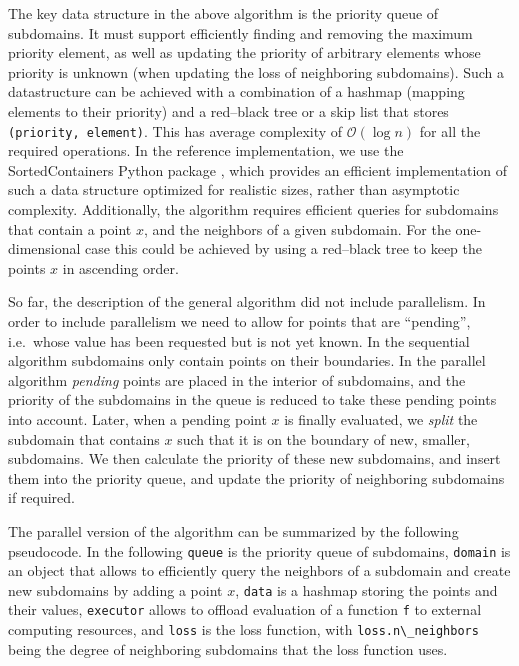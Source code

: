 
The key data structure in the above algorithm is the priority queue of subdomains.
It must support efficiently finding and removing the maximum priority element, as well as updating the priority of arbitrary elements whose priority is unknown (when updating the loss of neighboring subdomains).
Such a datastructure can be achieved with a combination of a hashmap (mapping elements to their priority) and a red--black tree or a skip list \cite{Cormen2009} that stores \passthrough{\lstinline!(priority, element)!}.
This has average complexity of $\mathcal{O}(\log{n})$ for all the required operations.
In the reference implementation, we use the SortedContainers Python package \cite{Jenks2014}, which provides an efficient implementation of such a data structure optimized for realistic sizes, rather than asymptotic complexity.
Additionally, the algorithm requires efficient queries for subdomains that contain a point $x$, and the neighbors of a given subdomain.
For the one-dimensional case this could be achieved by using a red--black tree to keep the points $x$ in ascending order.


So far, the description of the general algorithm did not include parallelism.
In order to include parallelism we need to allow for points that are ``pending'', i.e.~whose value has been requested but is not yet known.
In the sequential algorithm subdomains only contain points on their boundaries.
In the parallel algorithm \emph{pending} points are placed in the interior of subdomains, and the priority of the subdomains in the queue is reduced to take these pending points into account.
Later, when a pending point $x$ is finally evaluated, we \emph{split} the subdomain that contains $x$ such that it is on the boundary of new, smaller, subdomains.
We then calculate the priority of these new subdomains, and insert them into the priority queue, and update the priority of neighboring subdomains if required.


The parallel version of the algorithm can be summarized by the following pseudocode.
In the following \passthrough{\lstinline!queue!} is the priority queue of subdomains, \passthrough{\lstinline!domain!} is an object that allows to efficiently query the neighbors of a subdomain and create new subdomains by adding a point $x$, \passthrough{\lstinline!data!} is a hashmap storing the points and their values, \passthrough{\lstinline!executor!} allows to offload evaluation of a function \passthrough{\lstinline!f!} to external computing resources, and \passthrough{\lstinline!loss!} is the loss function, with \passthrough{\lstinline!loss.n\_neighbors!} being the degree of neighboring subdomains that the loss function uses.

